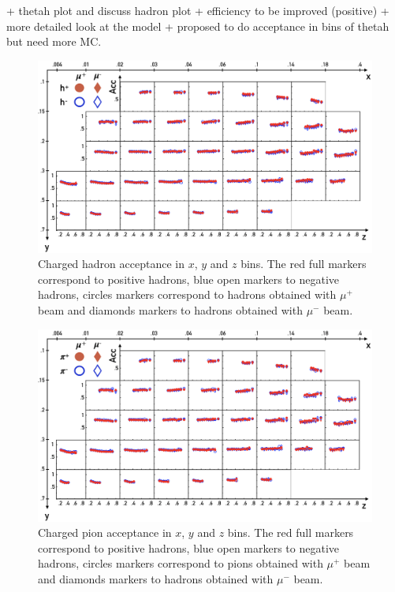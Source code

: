 + thetah plot and discuss hadron plot + efficiency to be improved (positive) + more detailed look at the model + proposed to do acceptance in bins of thetah but need more MC.

\begin{figure}
  \centering
	\includegraphics[scale=0.6]{./gfx/AccH.png}
	\caption{Charged hadron acceptance in $x$, $y$ and $z$ bins. The red full markers correspond to positive hadrons, blue open markers to negative hadrons, circles markers correspond to hadrons obtained with $\mu^+$ beam and diamonds markers to hadrons obtained with $\mu^-$ beam.}
	\label{pic:AccH}
\end{figure}

\begin{figure}
  \centering
	\includegraphics[scale=0.6]{./gfx/AccPi.png}
	\caption{Charged pion acceptance in $x$, $y$ and $z$ bins. The red full markers correspond to positive hadrons, blue open markers to negative hadrons, circles markers correspond to pions obtained with $\mu^+$ beam and diamonds markers to hadrons obtained with $\mu^-$ beam.}
	\label{pic:AccPi}
\end{figure}


